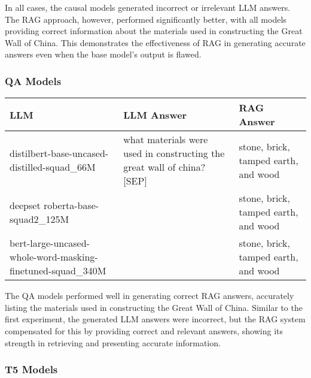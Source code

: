 \documentclass[11pt]{wseas}
\begin{document}
In all cases, the causal models generated incorrect or irrelevant LLM
answers. The RAG approach, however, performed significantly better, with
all models providing correct information about the materials used in
constructing the Great Wall of China. This demonstrates the
effectiveness of RAG in generating accurate answers even when the base
model's output is flawed.

\subsubsection{QA Models}\label{qa-models}

\begin{longtable}[]{@{}
  >{\raggedright\arraybackslash}p{}
  >{\raggedright\arraybackslash}p{}
  >{\raggedright\arraybackslash}p{}@{}}
\toprule\noalign{}
\begin{minipage}[b]{\linewidth}\raggedright
LLM
\end{minipage} & \begin{minipage}[b]{\linewidth}\raggedright
LLM Answer
\end{minipage} & \begin{minipage}[b]{\linewidth}\raggedright
RAG Answer
\end{minipage} \\
\midrule\noalign{}
\endhead
\bottomrule\noalign{}
\endlastfoot
distilbert-base-uncased-distilled-squad\_66M & what materials were used
in constructing the great wall of china? {[}SEP{]} & stone, brick,
tamped earth, and wood \\
deepset roberta-base-squad2\_125M & & stone, brick, tamped earth, and
wood \\
bert-large-uncased-whole-word-masking-finetuned-squad\_340M & & stone,
brick, tamped earth, and wood \\
\end{longtable}

The QA models performed well in generating correct RAG answers,
accurately listing the materials used in constructing the Great Wall of
China. Similar to the first experiment, the generated LLM answers were
incorrect, but the RAG system compensated for this by providing correct
and relevant answers, showing its strength in retrieving and presenting
accurate information.

\subsubsection{T5 Models}\label{t5-models}
\end{document}
